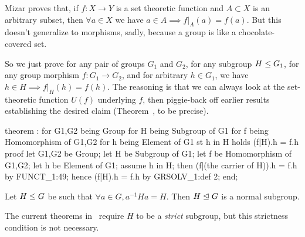 \begin{thm-remark}
Mizar proves that, if $f\colon X\to Y$ is a set theoretic function and
$A\subset X$ is an arbitrary subset, then $\forall a\in X$ we have
$a\in A\implies f|_{A}(a)=f(a)$. But this doesn't generalize to
morphisms, sadly, because a group is like a chocolate-covered set.

So we just prove for any pair of groups $G_{1}$ and $G_{2}$,
for any subgroup $H\leq G_{1}$,
for any group morphism $f\colon G_{1}\to G_{2}$, and for arbitrary $h\in G_{1}$,
we have $h\in H\implies f|_{H}(h) = f(h)$. The reasoning is that we can
always look at the set-theoretic function $U(f)$ underlying $f$, then
piggie-back off earlier results establishing the desired claim
(Theorem~, to be precise).
\end{thm-remark}


\nwenddocs{}\endmoddef\nwstartdeflinemarkup{}\nwenddeflinemarkup
theorem :
  for G1,G2 being Group
  for H being Subgroup of G1
  for f being Homomorphism of G1,G2
  for h being Element of G1
  st h in H
  holds (f|H).h = f.h
proof
  let G1,G2 be Group;
  let H be Subgroup of G1;
  let f be Homomorphism of G1,G2;
  let h be Element of G1;
  assume h in H;
  then (f|(the carrier of H)).h = f.h by FUNCT_1:49;
  hence (f|H).h = f.h by GRSOLV_1:def 2;
end;
\eatline
{}\nwendcode{}\nwdocspar
\begin{theorem}\label{thm:characteristic:preparatory:normal-subgroup}
Let $H\leq G$ be such that $\forall a\in G, a^{-1}Ha=H$.
Then $H\trianglelefteq G$ is a normal subgroup.
\end{theorem}

\begin{thm-remark}
The current theorems in~ require $H$ to be a \emph{strict}
subgroup, but this strictness condition is not necessary.
\end{thm-remark}


